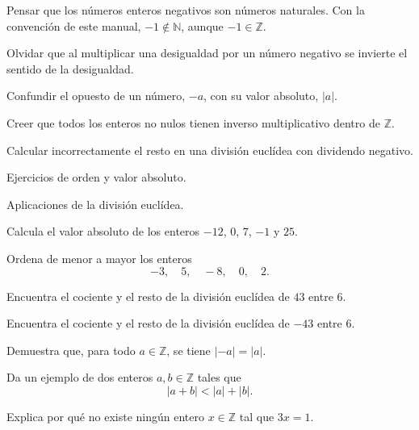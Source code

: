 \begin{erroresfrecuentes}
  \item Pensar que los números enteros negativos son números naturales. Con la convención de este manual, \(-1\notin\mathbb{N}\), aunque \(-1\in\mathbb{Z}\).
  \item Olvidar que al multiplicar una desigualdad por un número negativo se invierte el sentido de la desigualdad.
  \item Confundir el opuesto de un número, \(-a\), con su valor absoluto, \(|a|\).
  \item Creer que todos los enteros no nulos tienen inverso multiplicativo dentro de \(\mathbb{Z}\).
  \item Calcular incorrectamente el resto en una división euclídea con dividendo negativo.
\end{erroresfrecuentes}

\begin{seminario}
  \item Ejercicios de orden y valor absoluto.
  \item Aplicaciones de la división euclídea.
\end{seminario}

\begin{ejerciciospropuestos}
  \item Calcula el valor absoluto de los enteros \(-12\), \(0\), \(7\), \(-1\) y \(25\).
  \item Ordena de menor a mayor los enteros
  \[
    -3,
    \quad 5,
    \quad -8,
    \quad 0,
    \quad 2.
  \]
  \item Encuentra el cociente y el resto de la división euclídea de \(43\) entre \(6\).
  \item Encuentra el cociente y el resto de la división euclídea de \(-43\) entre \(6\).
  \item Demuestra que, para todo \(a\in\mathbb{Z}\), se tiene \(|-a|=|a|\).
  \item Da un ejemplo de dos enteros \(a,b\in\mathbb{Z}\) tales que
  \[
    |a+b|<|a|+|b|.
  \]
  \item Explica por qué no existe ningún entero \(x\in\mathbb{Z}\) tal que \(3x=1\).
\end{ejerciciospropuestos}

